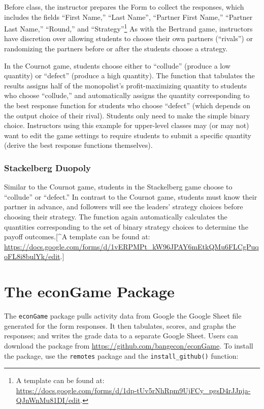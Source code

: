 \documentclass[
]{article}
\begin{document}
Before class, the instructor prepares the Form to collect the responses,
which includes the fields ``First Name,'' ``Last Name'', ``Partner First
Name,'' ``Partner Last Name,'' ``Round,'' and ``Strategy''\footnote{A
  template can be found at:\\
  \url{https://docs.google.com/forms/d/1dp-tUv5rNhRpm9UjFCy_pgsD4rJJnja-QJnWnMu81DI/edit}.}
As with the Bertrand game, instructors have discretion over allowing
students to choose their own partners (``rivals'') or randomizing the
partners before or after the students choose a strategy.

In the Cournot game, students choose either to ``collude'' (produce a
low quantity) or ``defect'' (produce a high quantity). The function that
tabulates the results assigns half of the monopolist's profit-maximizing
quantity to students who choose ``collude,'' and automatically assigns
the quantity corresponding to the best response function for students
who choose ``defect'' (which depends on the output choice of their
rival). Students only need to make the simple binary choice. Instructors
using this example for upper-level classes may (or may not) want to edit
the game settings to require students to submit a specific quantity
(derive the best response functions themselves).

\hypertarget{stackelberg-duopoly}{%
\subsubsection{Stackelberg Duopoly}\label{stackelberg-duopoly}}

Similar to the Cournot game, students in the Stackelberg game choose to
``collude'' or ``defect.'' In contrast to the Cournot game, students
must know their partner in advance, and followers will see the leaders'
strategy choices before choosing their strategy. The function again
automatically calculates the quantities corresponding to the set of
binary strategy choices to determine the payoff outcomes.{[}\^{}A
template can be found at:\\
\url{https://docs.google.com/forms/d/1vERPMPt_kW96JPAY6mEtkQMu6FLCgPuqoFL8i8bulYk/edit}.{]}

\hypertarget{the-econgame-package}{%
\section{The econGame Package}\label{the-econgame-package}}

The \texttt{econGame} package pulls activity data from Google the Google
Sheet file generated for the form responses. It then tabulates, scores,
and graphs the responses; and writes the grade data to a separate Google
Sheet. Users can download the package from
\url{https://github.com/bangecon/econGame}. To install the package, use
the \texttt{remotes} package and the \texttt{install\_github()}
function:
\end{document}
